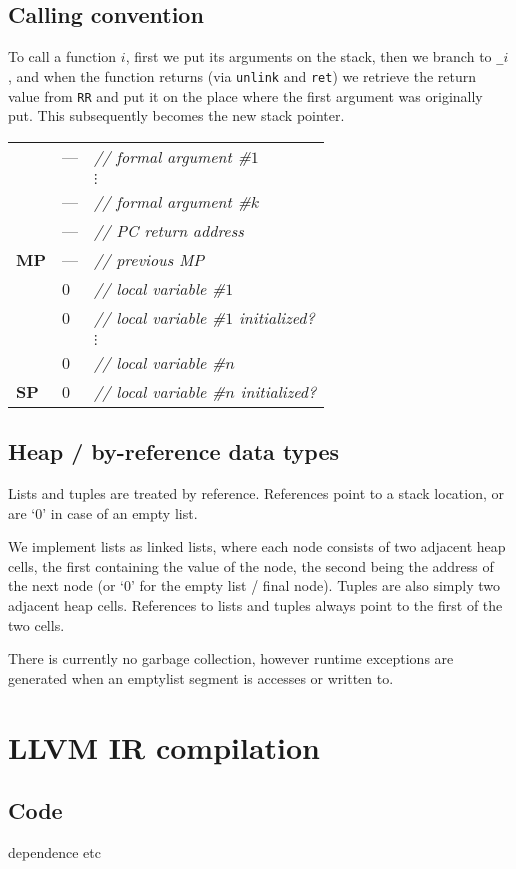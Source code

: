 \documentclass[english,10pt]{article} %
\theoremstyle{definitionstyle}
\theoremstyle{lemmastyle}
\newcommand{\asmcomment}[1]{\normalfont\itshape// #1}
\newcommand{\asmpointer}[1]{\textbf{#1}}
\newenvironment{Block}[1]{%
\begin{Warning}[singleextra={\path let \p1=(P), \p2=(O) in ($(\x2,0)+0.5*(0,\y1)$) node[mdframeleftlinetitle] {#1};}]%
}{%
\end{Warning}%
}
\begin{document}
\subsection{Calling convention}

To call a function $i$, first we put its arguments on the stack, then we branch to \texttt{_$i$}, and when the function returns (via \texttt{unlink} and \texttt{ret}) we retrieve the return value from \texttt{RR} and put it on the place where the first argument was originally put. This subsequently becomes the new stack pointer.

\begin{Block}{Stack after link}

\begin{tabular}{@{}lll@{}}
  & --- & \asmcomment{formal argument \#$1$} \\
  & & $\vdots$ \\
  & --- & \asmcomment{formal argument \#$k$} \\
  & --- & \asmcomment{PC return address} \\
  \midrule
  \asmpointer{MP} & --- & \asmcomment{previous MP} \\
  & 0 & \asmcomment{local variable \#$1$} \\
  & 0 & \asmcomment{local variable \#$1$ initialized?} \\
  &   & $\vdots$ \\
  & 0 & \asmcomment{local variable \#$n$} \\
  \asmpointer{SP} & 0 & \asmcomment{local variable \#$n$ initialized?}
\end{tabular}

\end{Block}


\subsection{Heap / by-reference data types}

Lists and tuples are treated by reference. References point to a stack location, or are `0' in case of an empty list.

We implement lists as linked lists, where each node consists of two adjacent heap cells, the first containing the value of the node, the second being the address of the next node (or `0' for the empty list / final node). Tuples are also simply two adjacent heap cells. References to lists and tuples always point to the first of the two cells.

There is currently no garbage collection, however runtime exceptions are generated when an emptylist segment is accesses or written to.


\section{LLVM IR compilation}


\begin{appendix}

\section{Code}

dependence etc

\end{appendix}

\cleardoublepage
{}
{}
\nocite{*}
\raggedright

{}
\end{document}
